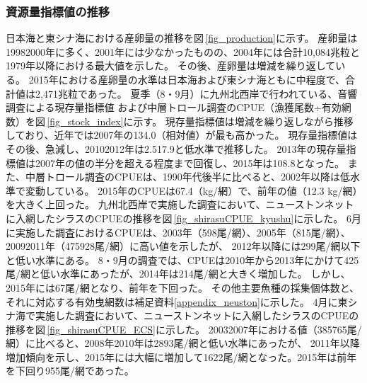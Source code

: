 \subsubsection{資源量指標値の推移}
\textcolor[cmyk]{0,1,0,0}{日本海と東シナ海における産卵量の推移を図\,\ref{fig_production}に示す。
産卵量は19982000年に多く、2001年には少なかったものの、2004年には合計10,084兆粒と1979年以降における最大値を示した。
その後、産卵量は増減を繰り返している。
2015年における産卵量の水準は日本海および東シナ海ともに中程度で、合計値は2,471兆粒であった。
%
%
夏季（8・9月）に九州北西岸で行われている、音響調査による現存量指標値\citep{Ohshimo2004}
および中層トロール調査のCPUE（漁獲尾数÷有効網数）を図\,\ref{fig_stock_index}に示す。
現存量指標値は増減を繰り返しながら推移しており、近年では2007年の134.0（相対値）が最も高かった。
現存量指標値はその後、急減し、20102012年は2.517.9と低水準で推移した。
2013年の現存量指標値は2007年の値の半分を超える程度まで回復し、2015年は108.8となった。
また、中層トロール調査のCPUEは、1990年代後半に比べると、2002年以降は低水準で変動している。
2015年のCPUEは67.4（kg/網）で、前年の値（12.3 kg/網）を大きく上回った。
%
%
九州北西岸で実施した調査において、ニューストンネットに入網したシラスのCPUEの推移を図\,\ref{fig_shirasuCPUE_kyushu}に示した。
6月に実施した調査におけるCPUEは、2003年（598尾/網）、2005年（815尾/網）、20092011年（475928尾/網）に高い値を示したが、
2012年以降には299尾/網以下と低い水準にある。
%
8・9月の調査では、CPUEは2010年から2013年にかけて425尾/網と低い水準にあったが、2014年は214尾/網と大きく増加した。
しかし、2015年には67尾/網となり、前年を下回った。
その他主要魚種の採集個体数と、それに対応する有効曳網数は補足資料\ref{appendix_neuston}に示した。
4月に東シナ海で実施した調査において、ニューストンネットに入網したシラスのCPUEの推移を図\,\ref{fig_shirasuCPUE_ECS}に示した。
20032007年における値（385765尾/網）に比べると、2008年2010年は2893尾/網と低い水準にあったが、
2011年以降増加傾向を示し、2015年には大幅に増加して1622尾/網となった。2015年は前年を下回り955尾/網であった。}
